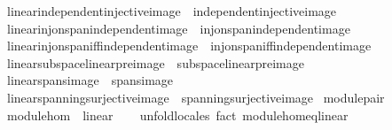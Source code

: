 \begin{isabellebody}
\ \ \ linear{\isacharunderscore}{\kern0pt}independent{\isacharunderscore}{\kern0pt}injective{\isacharunderscore}{\kern0pt}image\ {\isacharequal}{\kern0pt}\ independent{\isacharunderscore}{\kern0pt}injective{\isacharunderscore}{\kern0pt}image\isanewline
\ \ \ linear{\isacharunderscore}{\kern0pt}inj{\isacharunderscore}{\kern0pt}on{\isacharunderscore}{\kern0pt}span{\isacharunderscore}{\kern0pt}independent{\isacharunderscore}{\kern0pt}image\ {\isacharequal}{\kern0pt}\ inj{\isacharunderscore}{\kern0pt}on{\isacharunderscore}{\kern0pt}span{\isacharunderscore}{\kern0pt}independent{\isacharunderscore}{\kern0pt}image\isanewline
\ \ \ linear{\isacharunderscore}{\kern0pt}inj{\isacharunderscore}{\kern0pt}on{\isacharunderscore}{\kern0pt}span{\isacharunderscore}{\kern0pt}iff{\isacharunderscore}{\kern0pt}independent{\isacharunderscore}{\kern0pt}image\ {\isacharequal}{\kern0pt}\ inj{\isacharunderscore}{\kern0pt}on{\isacharunderscore}{\kern0pt}span{\isacharunderscore}{\kern0pt}iff{\isacharunderscore}{\kern0pt}independent{\isacharunderscore}{\kern0pt}image\isanewline
\ \ \ linear{\isacharunderscore}{\kern0pt}subspace{\isacharunderscore}{\kern0pt}linear{\isacharunderscore}{\kern0pt}preimage\ {\isacharequal}{\kern0pt}\ subspace{\isacharunderscore}{\kern0pt}linear{\isacharunderscore}{\kern0pt}preimage\isanewline
\ \ \ linear{\isacharunderscore}{\kern0pt}spans{\isacharunderscore}{\kern0pt}image\ {\isacharequal}{\kern0pt}\ spans{\isacharunderscore}{\kern0pt}image\isanewline
\ \ \ linear{\isacharunderscore}{\kern0pt}spanning{\isacharunderscore}{\kern0pt}surjective{\isacharunderscore}{\kern0pt}image\ {\isacharequal}{\kern0pt}\ spanning{\isacharunderscore}{\kern0pt}surjective{\isacharunderscore}{\kern0pt}image\isanewline
{}\isamarkupfalse%
\isanewline
\isanewline
{}\isamarkupfalse%
\ module{\isacharunderscore}{\kern0pt}pair\isanewline
\ \ \ {\isachardoublequoteopen}module{\isacharunderscore}{\kern0pt}hom\ {\isacharequal}{\kern0pt}\ linear{\isachardoublequoteclose}\isanewline
%
\isadelimproof
\ \ %
\endisadelimproof
%
\isatagproof
{}\isamarkupfalse%
\ unfold{\isacharunderscore}{\kern0pt}locales\ {\isacharparenleft}{\kern0pt}fact\ module{\isacharunderscore}{\kern0pt}hom{\isacharunderscore}{\kern0pt}eq{\isacharunderscore}{\kern0pt}linear{\isacharparenright}{\kern0pt}%
\endisatagproof
{\isafoldproof}%
%
\isadelimproof
\isanewline
%
\endisadelimproof
\isanewline
{}\isamarkupfalse%
%
\end{isabellebody}
